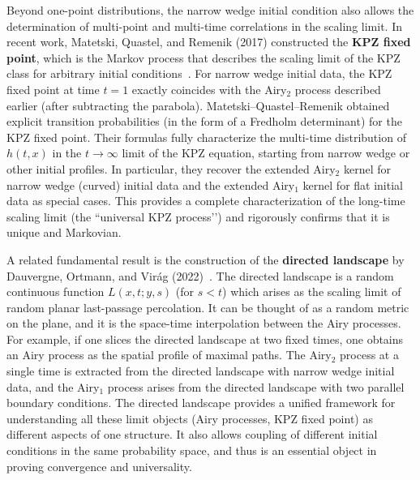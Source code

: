 \documentclass[letterpaper,11pt,oneside,reqno]{article}
\numberwithin{equation}{section}
\theoremstyle{definition}
\begin{document}
Beyond one-point distributions, the narrow wedge initial condition also allows the determination of multi-point and multi-time correlations in the scaling limit. In recent work, Matetski, Quastel, and Remenik (2017) constructed the \textbf{KPZ fixed point}, which is the Markov process that describes the scaling limit of the KPZ class for arbitrary initial conditions \cite{matetski2017kpz}. For narrow wedge initial data, the KPZ fixed point at time $t=1$ exactly coincides with the Airy$_2$ process described earlier (after subtracting the parabola). Matetski–Quastel–Remenik obtained explicit transition probabilities (in the form of a Fredholm determinant) for the KPZ fixed point. Their formulas fully characterize the multi-time distribution of $h(t,x)$ in the $t\to\infty$ limit of the KPZ equation, starting from narrow wedge or other initial profiles. In particular, they recover the extended Airy$_2$ kernel for narrow wedge (curved) initial data and the extended Airy$_1$ kernel for flat initial data as special cases. This provides a complete characterization of the long-time scaling limit (the ``universal KPZ process’’) and rigorously confirms that it is unique and Markovian.

A related fundamental result is the construction of the \textbf{directed landscape} by Dauvergne, Ortmann, and Virág (2022) \cite{directed_landscape}. The directed landscape is a random continuous function $L(x,t; y,s)$ (for $s<t$) which arises as the scaling limit of random planar last-passage percolation. It can be thought of as a random metric on the plane, and it is the space-time interpolation between the Airy processes. For example, if one slices the directed landscape at two fixed times, one obtains an Airy process as the spatial profile of maximal paths. The Airy$_2$ process at a single time is extracted from the directed landscape with narrow wedge initial data, and the Airy$_{1}$ process arises from the directed landscape with two parallel boundary conditions. The directed landscape provides a unified framework for understanding all these limit objects (Airy processes, KPZ fixed point) as different aspects of one structure. It also allows coupling of different initial conditions in the same probability space, and thus is an essential object in proving convergence and universality.
\end{document}
